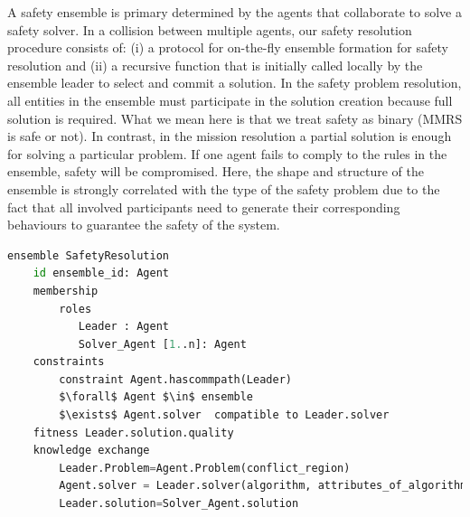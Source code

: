 \documentclass[journal]{IEEEtran}
\theoremstyle{definition}
\newcommand{\ugh}[1]{\textcolor{red}{\uwave{#1}}} %
\newcommand\patrizio[1]{\nb{Patrizio}{#1}}
\begin{document}
A safety ensemble is primary determined by the agents that collaborate to solve a safety solver. In a collision between multiple agents, our safety resolution procedure consists of: (i) a protocol for on-the-fly ensemble formation for safety resolution and (ii) a recursive function that is initially called locally by the ensemble leader to select and commit a solution. In the safety problem resolution, all entities in the ensemble must  participate in the solution creation because full solution is required. What we mean here is that we treat safety as binary (MMRS is safe or not). In contrast, in the mission resolution a partial solution is enough for solving a particular problem.
If one agent fails to comply to the rules in the ensemble, safety will be compromised. Here, the shape and structure of the ensemble is strongly correlated with the type of the safety problem due to the fact that all involved participants need to generate their corresponding behaviours to guarantee the safety of the system.





\begin{lstlisting}[caption=EDL Specification for safety resolution ensembles, language=Python, mathescape=true, label=lstSafety]
ensemble SafetyResolution
    id ensemble_id: Agent
    membership
        roles
           Leader : Agent
           Solver_Agent [1..n]: Agent
    constraints
        constraint Agent.hascommpath(Leader)
        $\forall$ Agent $\in$ ensemble
        $\exists$ Agent.solver  compatible to Leader.solver
    fitness Leader.solution.quality
    knowledge exchange
        Leader.Problem=Agent.Problem(conflict_region)
        Agent.solver = Leader.solver(algorithm, attributes_of_algorithm)
        Leader.solution=Solver_Agent.solution
\end{lstlisting}
\end{document}
